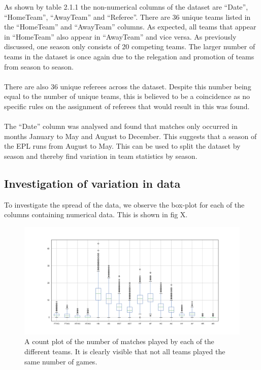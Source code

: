 \documentclass[a4paper,12pt]{article}
\begin{document}
		As shown by table 2.1.1 the non-numerical columns of the dataset are “Date”, “HomeTeam”, “AwayTeam” and “Referee”. There are 36 unique teams listed in the “HomeTeam” and “AwayTeam” columns. As expected, all teams that appear in “HomeTeam” also appear in “AwayTeam” and vice versa. As previously discussed, one season only consists of 20 competing teams. The larger number of teams in the dataset is once again due to the relegation and promotion of teams from season to season.\\
		\\
		There are also 36 unique referees across the dataset. Despite this number being equal to the number of unique teams, this is believed to be a coincidence as no specific rules on the assignment of referees that would result in this was found.\\
		\\
		The “Date” column was analysed and found that matches only occurred in months January to May and August to December. This suggests that a season of the EPL runs from August to May. This can be used to split the dataset by season and thereby find variation in team statistics by season.  
	
	\subsection{Investigation of variation in data}
	
		To investigate the spread of the data, we observe the box-plot for each of the columns containing numerical data. This is shown in fig X.
		
		\begin{figure}[H]
			\centering
			
			\includegraphics[scale=0.32]{raw_box_plot.png}
			\caption{A count plot of the number of matches played by each of the different teams. It is clearly visible that not all teams played the same number of games.}
		\end{figure}
	
\end{document}
